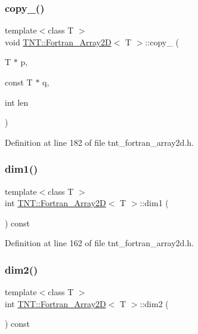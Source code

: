 \subsubsection{\texorpdfstring{copy\+\_\+()}{copy\_()}}
{\footnotesize\ttfamily template$<$class T $>$ \\
void \hyperlink{classTNT_1_1Fortran__Array2D}{T\+N\+T\+::\+Fortran\+\_\+\+Array2D}$<$ T $>$\+::copy\+\_\+ (\begin{DoxyParamCaption}\item[{T $\ast$}]{p,  }\item[{const T $\ast$}]{q,  }\item[{int}]{len }\end{DoxyParamCaption})\hspace{0.3cm}{\ttfamily [private]}}



Definition at line 182 of file tnt\+\_\+fortran\+\_\+array2d.\+h.

\mbox{\label{classTNT_1_1Fortran__Array2D_ad47134ab6502c9c86a7a84a780916ef4}} 
\subsubsection{\texorpdfstring{dim1()}{dim1()}}
{\footnotesize\ttfamily template$<$class T $>$ \\
int \hyperlink{classTNT_1_1Fortran__Array2D}{T\+N\+T\+::\+Fortran\+\_\+\+Array2D}$<$ T $>$\+::dim1 (\begin{DoxyParamCaption}{ }\end{DoxyParamCaption}) const\hspace{0.3cm}{\ttfamily [inline]}}



Definition at line 162 of file tnt\+\_\+fortran\+\_\+array2d.\+h.

\mbox{\label{classTNT_1_1Fortran__Array2D_aac2d118c850caab27fdcbc7a66baabed}} 
\subsubsection{\texorpdfstring{dim2()}{dim2()}}
{\footnotesize\ttfamily template$<$class T $>$ \\
int \hyperlink{classTNT_1_1Fortran__Array2D}{T\+N\+T\+::\+Fortran\+\_\+\+Array2D}$<$ T $>$\+::dim2 (\begin{DoxyParamCaption}{ }\end{DoxyParamCaption}) const\hspace{0.3cm}{\ttfamily [inline]}}



